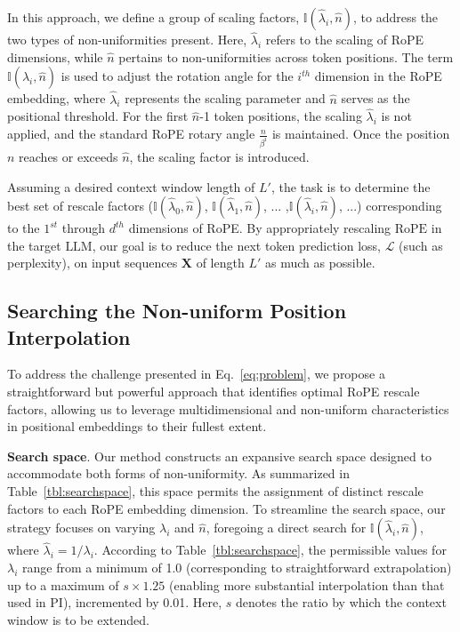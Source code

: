 In this approach, we define a group of scaling factors, $\mathbb{I}(\hat{\lambda}_{i},\hat{n})$, to address the two types of non-uniformities present. Here, $\hat{\lambda}_{i}$ refers to the scaling of RoPE dimensions, while $\hat{n}$ pertains to non-uniformities across token positions. The term $\mathbb{I}(\hat{\lambda}_{i},\hat{n})$ is used to adjust the rotation angle for the $i^{th}$ dimension in the RoPE embedding, where $\hat{\lambda}_{i}$ represents the scaling parameter and $\hat{n}$ serves as the positional threshold. For the first $\hat{n}$-1 token positions, the scaling $\hat{\lambda}_{i}$ is not applied, and the standard RoPE rotary angle $\frac{n}{\beta^i}$ is maintained. Once the position $n$ reaches or exceeds $\hat{n}$, the scaling factor is introduced.

Assuming a desired context window length of $L'$, the task is to determine the best set of rescale factors ($\mathbb{I}(\hat{\lambda}_{0},\hat{n})$, $\mathbb{I}(\hat{\lambda}_{1},\hat{n})$, ... ,$\mathbb{I}(\hat{\lambda}_{i},\hat{n})$, ...) corresponding to the $1^{st}$ through $d^{th}$ dimensions of RoPE. By appropriately rescaling $\text{RoPE}$ in the target $\text{LLM}$, our goal is to reduce the next token prediction loss, $\mathcal{L}$ (such as perplexity), on input sequences $\mathbf{X}$ of length $L'$ as much as possible.

\subsection{Searching the Non-uniform Position Interpolation}

To address the challenge presented in Eq.~\ref{eq:problem}, we propose a straightforward but powerful approach that identifies optimal RoPE rescale factors, allowing us to leverage multidimensional and non-uniform characteristics in positional embeddings to their fullest extent.

\textbf{Search space}. Our method constructs an expansive search space designed to accommodate both forms of non-uniformity. As summarized in Table~\ref{tbl:searchspace}, this space permits the assignment of distinct rescale factors to each RoPE embedding dimension. To streamline the search space, our strategy focuses on varying $\lambda_i$ and $\hat{n}$, foregoing a direct search for $\mathbb{I}(\hat{\lambda}_{i},\hat{n})$, where $\hat{\lambda}_{i}=1/\lambda_i$. According to Table~\ref{tbl:searchspace}, the permissible values for $\lambda_i$ range from a minimum of 1.0 (corresponding to straightforward extrapolation) up to a maximum of $s\times1.25$ (enabling more substantial interpolation than that used in PI), incremented by 0.01. Here, $s$ denotes the ratio by which the context window is to be extended.

